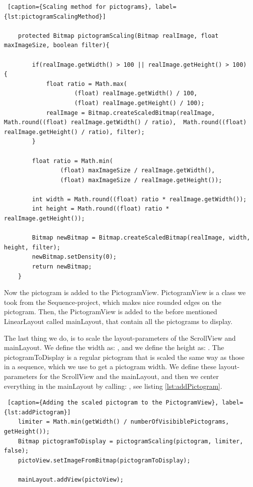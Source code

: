 \begin{lstlisting} [caption={Scaling method for pictograms}, label={lst:pictogramScalingMethod}]

    protected Bitmap pictogramScaling(Bitmap realImage, float maxImageSize, boolean filter){

        if(realImage.getWidth() > 100 || realImage.getHeight() > 100) {
            float ratio = Math.max(
                    (float) realImage.getWidth() / 100,
                    (float) realImage.getHeight() / 100);
            realImage = Bitmap.createScaledBitmap(realImage, Math.round((float) realImage.getWidth() / ratio),  Math.round((float) realImage.getHeight() / ratio), filter);
        }

        float ratio = Math.min(
                (float) maxImageSize / realImage.getWidth(),
                (float) maxImageSize / realImage.getHeight());

        int width = Math.round((float) ratio * realImage.getWidth());
        int height = Math.round((float) ratio * realImage.getHeight());

        Bitmap newBitmap = Bitmap.createScaledBitmap(realImage, width, height, filter);
        newBitmap.setDensity(0);
        return newBitmap;
    }
\end{lstlisting}

Now the pictogram is added to the PictogramView. PictogramView is a class we took from the Sequence-project, which makes nice rounded edges on the pictogram. Then, the PictogramView is added to the before mentioned LinearLayout called mainLayout, that contain all the pictograms to display.

The last thing we do, is to scale the layout-parameters of the ScrollView and mainLayout. We define the width as: , and we define the height as: . The pictogramToDisplay is a regular pictogram that is scaled the same way as those in a sequence, which we use to get a pictogram width. We define these layout-parameters for the ScrollView and the mainLayout, and then we center everything in the mainLayout by calling: , see listing \ref{lst:addPictogram}.

\begin{lstlisting} [caption={Adding the scaled pictogram to the PictogramView}, label={lst:addPictogram}]
	limiter = Math.min(getWidth() / numberOfVisibiblePictograms, getHeight());
	Bitmap pictogramToDisplay = pictogramScaling(pictogram, limiter, false);
	pictoView.setImageFromBitmap(pictogramToDisplay);
	
	mainLayout.addView(pictoView);
\end{lstlisting}

